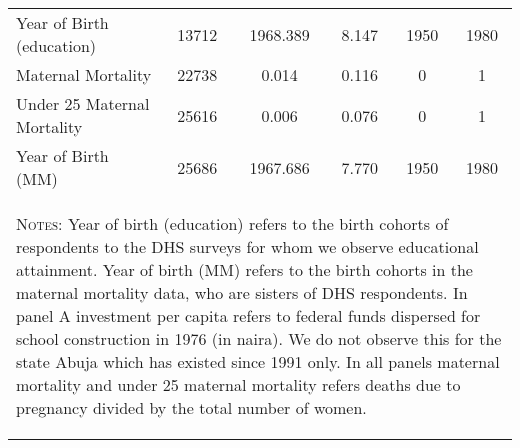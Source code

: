 \begin{subtables}
\begin{table}[htpb!]
\begin{center}
\begin{tabular}{l c c c c c}
Year of Birth (education)	&	13712	&	1968.389	&	8.147	&	1950	&	1980	\\
Maternal Mortality	&	22738	&	0.014	&	0.116	&	0	&	1	\\
Under 25 Maternal Mortality	&	25616	&	0.006	&	0.076	&	0	&	1	\\
Year of Birth (MM)	&	25686	&	1967.686	&	7.770	&	1950	&	1980	\\
\midrule											
\multicolumn{6}{p{12cm}}{\begin{footnotesize}\textsc{Notes:}  Year of birth (education) refers to the birth cohorts of respondents to the DHS surveys for whom we observe educational attainment.  Year of birth (MM) refers to the birth cohorts in the maternal mortality data, who are sisters of DHS respondents.  In panel A investment per capita refers to federal funds dispersed for school construction in 1976 (in naira).  We do not observe this for the state Abuja which has existed since 1991 only.  In all panels maternal mortality and under 25 maternal mortality refers deaths due to pregnancy divided by the total number of women. \end{footnotesize}} \\											
\bottomrule											
\end{tabular}											
\end{center}											
\end{table}											
\end{subtables}
















